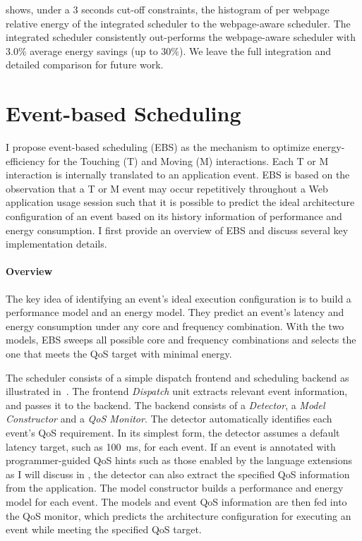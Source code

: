  shows, under a 3 seconds cut-off constraints, the histogram of per webpage relative energy of the integrated scheduler to the webpage-aware scheduler.  The integrated scheduler consistently out-performs the webpage-aware scheduler with 3.0\% average energy savings (up to 30\%).  We leave the full integration and detailed comparison for future work.

\section{Event-based Scheduling}
\label{sec:runtime:ebs}

I propose event-based scheduling (EBS) as the mechanism to optimize energy-efficiency for the Touching (T) and Moving (M) interactions. Each T or M interaction is internally translated to an application event. EBS is based on the observation that a T or M event may occur repetitively throughout a Web application usage session such that it is possible to predict the ideal architecture configuration of an event based on its history information of performance and energy consumption. I first provide an overview of EBS and discuss several key implementation details.

\paragraph{Overview} The key idea of identifying an event's ideal execution configuration is to build a performance model and an energy model. They predict an event's latency and energy consumption under any core and frequency combination. With the two models, EBS sweeps all possible core and frequency combinations and selects the one that meets the QoS target with minimal energy.

The scheduler consists of a simple dispatch frontend and scheduling backend as illustrated in~. The frontend \textit{Dispatch} unit extracts relevant event information, and passes it to the backend. The backend consists of a \textit{Detector}, a \textit{Model Constructor} and a \textit{QoS Monitor}. The detector
automatically identifies each event's QoS requirement. In its simplest form, the detector assumes a default latency target, such as 100~ms, for each event. If an event is annotated with programmer-guided QoS hints such as those enabled by the \greenweb language extensions as I will discuss in , the detector can also extract the specified QoS information from the application. The model constructor builds a performance and energy model for each event. The models and event QoS information are then fed into the QoS monitor, which predicts the architecture configuration for executing an event while meeting the specified QoS target.

